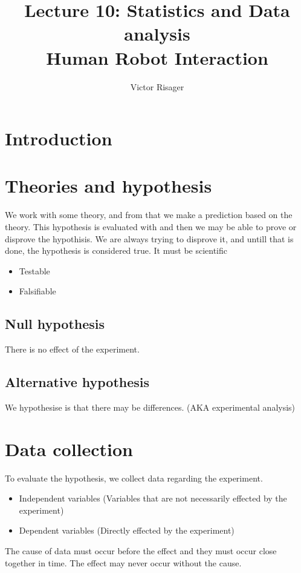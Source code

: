 \documentclass[a4paper]{article}
\title{Lecture 10: Statistics and Data analysis  \\
	\large Human Robot Interaction}
\author{Victor Risager}
\begin{document}
\maketitle

\section{Introduction}

\section{Theories and hypothesis}
We work with some theory, and from that we make a prediction based on the theory. This hypothesis is evaluated with and then we may be able to prove or disprove the hypothisis. We are always trying to disprove it, and untill that is done, the hypothesis is considered true. It must be scientific
\begin{itemize}
	\item Testable
	\item Falsifiable
\end{itemize}

\subsection{Null hypothesis}
There is no effect of the experiment. 

\subsection{Alternative hypothesis}
We hypothesise is that there may be differences. (AKA experimental analysis)


\section{Data collection}
To evaluate the hypothesis, we collect data regarding the experiment. 
\begin{itemize}
	\item Independent variables (Variables that are not necessarily effected by the experiment)
	\item Dependent variables (Directly effected by the experiment)
\end{itemize}


The cause of data must occur before the effect and they must occur close together in time. The effect may never occur without the cause.
\end{document}
